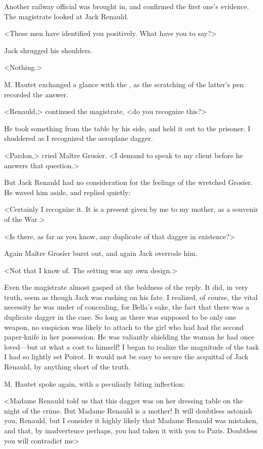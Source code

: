  Another railway official was brought in, and confirmed the first one's evidence. The magistrate looked at Jack Renauld. 

 <These men have identified you positively. What have you to say?> 

 Jack shrugged his shoulders. 

 <Nothing.> 

 M. Hautet exchanged a glance with the , as the scratching of the latter's pen recorded the answer. 

 <Renauld,> continued the magistrate, <do you recognize this?> 

 He took something from the table by his side, and held it out to the prisoner. I shuddered as I recognized the aeroplane dagger. 

 <Pardon,> cried Maître Grosíer. <I demand to speak to my client before he answers that question.> 

 But Jack Renauld had no consideration for the feelings of the wretched Grosíer. He waved him aside, and replied quietly: 

 <Certainly I recognize it. It is a present given by me to my mother, as a souvenir of the War.> 

 <Is there, as far as you know, any duplicate of that dagger in existence?> 

 Again Maître Grosíer burst out, and again Jack overrode him. 

 <Not that I know of. The setting was my own design.> 

 Even the magistrate almost gasped at the boldness of the reply. It did, in very truth, seem as though Jack was rushing on his fate. I realized, of course, the vital necessity he was under of concealing, for Bella's sake, the fact that there was a duplicate dagger in the case. So long as there was supposed to be only one weapon, no suspicion was likely to attach to the girl who had had the second paper-knife in her possession. He was valiantly shielding the woman he had once loved—but at what a cost to himself! I began to realize the magnitude of the task I had so lightly set Poirot. It would not be easy to secure the acquittal of Jack Renauld, by anything short of the truth. 

 M. Hautet spoke again, with a peculiarly biting inflection: 

 <Madame Renauld told us that this dagger was on her dressing table on the night of the crime. But Madame Renauld is a mother! It will doubtless astonish you, Renauld, but I consider it highly likely that Madame Renauld was mistaken, and that, by inadvertence perhaps, you had taken it with you to Paris. Doubtless you will contradict me\longdash> 

